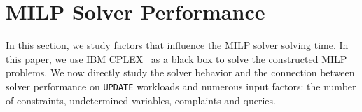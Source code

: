 % 





\section{MILP Solver Performance}
\label{app:solvtime}


In this section, we study factors that influence the MILP solver solving time. In this paper, we
use IBM CPLEX~\cite{cplex2014v12} as a black box to solve the constructed MILP problems. 
We now directly study the solver behavior and the connection between solver performance on \texttt{UPDATE} workloads and numerous
input factors: the number of constraints, undetermined variables, complaints and queries.

  

